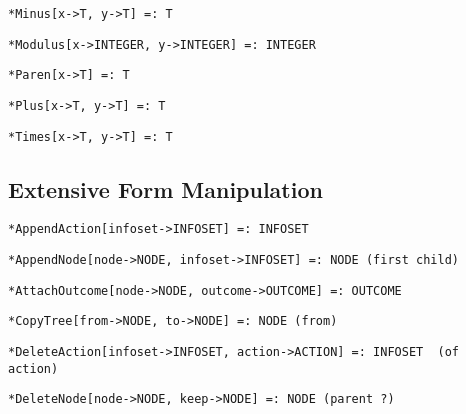 \protect \large \begin{verbatim}
*Minus[x->T, y->T] =: T
\end{verbatim} \normalsize


\protect \large \begin{verbatim}
*Modulus[x->INTEGER, y->INTEGER] =: INTEGER
\end{verbatim}\normalsize

\protect \large \begin{verbatim}
*Paren[x->T] =: T
\end{verbatim}\normalsize

\protect \large \begin{verbatim}
*Plus[x->T, y->T] =: T
\end{verbatim} \normalsize

\protect \large \begin{verbatim}
*Times[x->T, y->T] =: T
\end{verbatim} \normalsize

\medskip
\subsection{Extensive Form Manipulation}

\protect \large \begin{verbatim}
*AppendAction[infoset->INFOSET] =: INFOSET
\end{verbatim}\normalsize

\protect \large \begin{verbatim} 
*AppendNode[node->NODE, infoset->INFOSET] =: NODE (first child)
\end{verbatim}\normalsize

\protect \large \begin{verbatim} 
*AttachOutcome[node->NODE, outcome->OUTCOME] =: OUTCOME
\end{verbatim}\normalsize

\protect \large \begin{verbatim}
*CopyTree[from->NODE, to->NODE] =: NODE (from)
\end{verbatim}\normalsize

\protect \large \begin{verbatim}
*DeleteAction[infoset->INFOSET, action->ACTION] =: INFOSET  (of action)
\end{verbatim}\normalsize

\protect \large \begin{verbatim}
*DeleteNode[node->NODE, keep->NODE] =: NODE (parent ?)  
\end{verbatim}\normalsize

